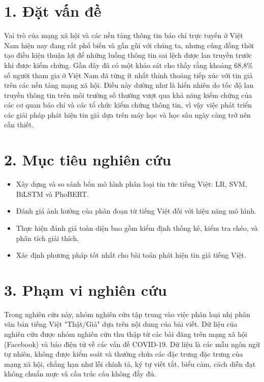 \documentclass[12pt, a4paper]{report}
\begin{document}
\section*{1. Đặt vấn đề}

Vai trò của mạng xã hội và các nền tảng thông tin báo chí trực tuyến ở Việt Nam hiện nay đang rất phổ biến và gần gũi với chúng ta, nhưng cũng đồng thời tạo điều kiện thuận lợi để những luồng thông tin sai lệch được lan truyền trước khi được kiểm chứng. Gần đây đã có một khảo sát cho thấy rằng khoảng 68,8\% số người tham gia ở Việt Nam đã từng ít nhất thỉnh thoảng tiếp xúc với tin giả trên các nền tảng mạng xã hội\cite{nguyen2025fakenews}. Điều này dường như là hiển nhiên do tốc độ lan truyền thông tin trên môi trường số thường vượt qua khả năng kiểm chứng của các cơ quan báo chí và các tổ chức kiểm chứng thông tin, vì vậy việc phát triển các giải pháp phát hiện tin giả dựa trên máy học và học sâu ngày càng trở nên cần thiết.

\section*{2. Mục tiêu nghiên cứu}

\begin{itemize}[leftmargin=2em]
  \item Xây dựng và so sánh bốn mô hình phân loại tin tức tiếng Việt: LR, SVM, BiLSTM và PhoBERT.
  \item Đánh giá ảnh hưởng của phân đoạn từ tiếng Việt đối với hiệu năng mô hình.
  \item Thực hiện đánh giá toàn diện bao gồm kiểm định thống kê, kiểm tra chéo, và phân tích giải thích.
  \item Xác định phương pháp tốt nhất cho bài toán phát hiện tin giả tiếng Việt.
\end{itemize}

\section*{3. Phạm vi nghiên cứu}

Trong nghiên cứu này, nhóm nghiên cứu tập trung vào việc phân loại nhị phân văn bản tiếng Việt "Thật/Giả" dựa trên nội dung của bài viết. Dữ liệu của nghiên cứu được nhóm nghiên cứu thu thập từ các bài đăng trên mạng xã hội (Facebook) và báo điện tử về các vấn đề COVID-19. Dữ liệu là các mẫu ngôn ngữ tự nhiên, không được kiểm soát và thường chứa các đặc trưng đặc trưng của mạng xã hội, chẳng hạn như lỗi chính tả, ký tự viết tắt, biểu cảm, cách diễn đạt không chuẩn mực và cấu trúc câu không đầy đủ.
\end{document}
